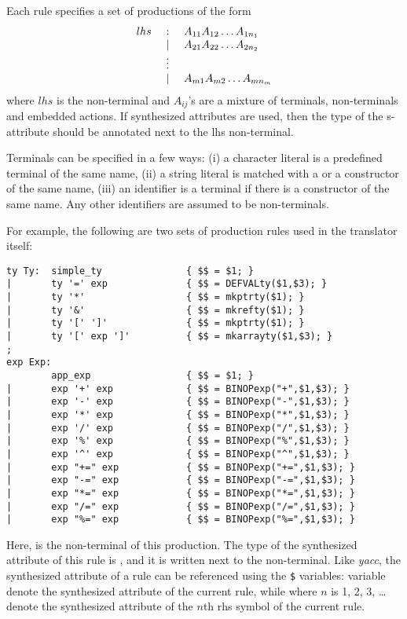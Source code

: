 Each rule specifies a set of productions of the form 
\[ \begin{array}{lcl}
    lhs &  :  & A_{11} A_{12} \ldots A_{1n_1} \\
        & \ \mbox{$\bf \mid$}\  & A_{21} A_{22} \ldots A_{2n_2} \\
        & \vdots & \\
        & \ \mbox{$\bf \mid$}\  & A_{m1} A_{m2} \ldots A_{mn_m} \\
   \end{array}
\]
where $lhs$ is the non-terminal and $A_{ij}$'s are a mixture of 
terminals, non-terminals and embedded actions.  If synthesized
attributes are used, then the type of the s-attribute should be
annotated next to the lhs non-terminal.

Terminals can be specified in a few ways: (i) a character literal
is a predefined terminal of the same name, (ii) a string literal
is matched with a  or a   constructor
of the same name, (iii) an identifier is a terminal if there is a 
 constructor of the same name.  Any other identifiers
are assumed to be non-terminals.

For example, the following are two sets of production rules used in the 
\Prop{} translator itself:
\begin{verbatim}
ty Ty:  simple_ty               { $$ = $1; }
|       ty '=' exp              { $$ = DEFVALty($1,$3); }
|       ty '*'                  { $$ = mkptrty($1); }
|       ty '&'                  { $$ = mkrefty($1); }
|       ty '[' ']'              { $$ = mkptrty($1); }
|       ty '[' exp ']'          { $$ = mkarrayty($1,$3); }
;
exp Exp:
        app_exp                 { $$ = $1; }
|       exp '+' exp             { $$ = BINOPexp("+",$1,$3); }
|       exp '-' exp             { $$ = BINOPexp("-",$1,$3); }
|       exp '*' exp             { $$ = BINOPexp("*",$1,$3); }
|       exp '/' exp             { $$ = BINOPexp("/",$1,$3); }
|       exp '%' exp             { $$ = BINOPexp("%",$1,$3); }
|       exp '^' exp             { $$ = BINOPexp("^",$1,$3); }
|       exp "+=" exp            { $$ = BINOPexp("+=",$1,$3); }
|       exp "-=" exp            { $$ = BINOPexp("-=",$1,$3); }
|       exp "*=" exp            { $$ = BINOPexp("*=",$1,$3); }
|       exp "/=" exp            { $$ = BINOPexp("/=",$1,$3); }
|       exp "%=" exp            { $$ = BINOPexp("%=",$1,$3); }
\end{verbatim}

Here,  is the non-terminal of this production.  The type of
the synthesized attribute of this rule is , and it is
written next to the non-terminal.  Like {\em yacc}, the synthesized
attribute of a rule can be referenced using the \verb.$. variables: 
variable \TDEF{\$\$} denote the synthesized attribute of the current rule,
while  where $n$ is 1, 2, 3, \ldots denote the synthesized
attribute of the $n$th rhs symbol of the current rule.

